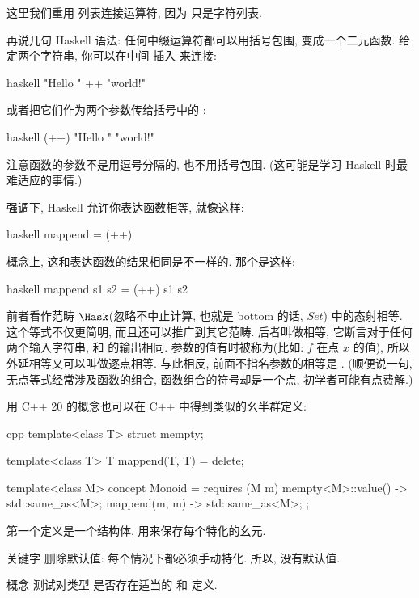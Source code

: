这里我们重用 \code{(++)} 列表连接运算符, 因为  只是字符列表.

再说几句 Haskell 语法: 任何中缀运算符都可以用括号包围, 变成一个二元函数. 给定两个字符串, 你可以在中间
插入 \code{++} 来连接:

\begin{snip}{haskell}
"Hello " ++ "world!"
\end{snip}

或者把它们作为两个参数传给括号中的 \code{(++)}:

\begin{snip}{haskell}
(++) "Hello " "world!"
\end{snip}
注意函数的参数不是用逗号分隔的, 也不用括号包围. (这可能是学习 Haskell 时最难适应的事情.)

强调下, Haskell 允许你表达函数相等, 就像这样:

\begin{snip}{haskell}
mappend = (++)
\end{snip}
概念上, 这和表达函数的结果相同是不一样的. 那个是这样:

\begin{snip}{haskell}
mappend s1 s2 = (++) s1 s2
\end{snip}
前者看作范畴 $\Hask$(忽略不中止计算, 也就是 bottom 的话, $Set$) 中的态射相等. 这个等式不仅更简明,
而且还可以推广到其它范畴. 后者叫做相等, 它断言对于任何两个输入字符串,
 和 \code{(++)} 的输出相同. 参数的值有时被称为(比如: $f$ 在点 $x$ 的值),
所以外延相等又可以叫做逐点相等. 与此相反, 前面不指名参数的相等是 .
(顺便说一句, 无点等式经常涉及函数的组合, 函数组合的符号却是一个点, 初学者可能有点费解.)

用 C++ 20 的概念也可以在 C++ 中得到类似的幺半群定义:

\begin{snip}{cpp}
template<class T>
struct mempty;

template<class T>
T mappend(T, T) = delete;

template<class M>
concept Monoid = requires (M m) {
    { mempty<M>::value() } -> std::same_as<M>;
    { mappend(m, m) } -> std::same_as<M>;
};
\end{snip}
第一个定义是一个结构体, 用来保存每个特化的幺元.

关键字  删除默认值: 每个情况下都必须手动特化. 所以,  没有默认值.

概念  测试对类型  是否存在适当的  和  定义.


